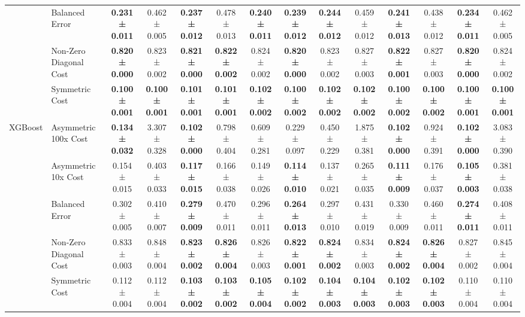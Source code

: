 \begin{table}[H]
{\begin{tabular}{llcccccccccccc}
 & Balanced Error & \textbf{0.231 ± 0.011} & 0.462 ± 0.005 & \textbf{0.237 ± 0.012} & 0.478 ± 0.013 & \textbf{0.240 ± 0.011} & \textbf{0.239 ± 0.012} & \textbf{0.244 ± 0.012} & 0.459 ± 0.012 & \textbf{0.241 ± 0.013} & 0.438 ± 0.012 & \textbf{0.234 ± 0.011} & 0.462 ± 0.005 \\
 & Non-Zero Diagonal Cost & \textbf{0.820 ± 0.000} & 0.823 ± 0.002 & \textbf{0.821 ± 0.000} & \textbf{0.822 ± 0.002} & 0.824 ± 0.002 & \textbf{0.820 ± 0.000} & 0.823 ± 0.002 & 0.827 ± 0.003 & \textbf{0.822 ± 0.001} & 0.827 ± 0.003 & \textbf{0.820 ± 0.000} & 0.824 ± 0.002 \\
 & Symmetric Cost & \textbf{0.100 ± 0.001} & \textbf{0.100 ± 0.001} & \textbf{0.101 ± 0.001} & \textbf{0.101 ± 0.001} & \textbf{0.102 ± 0.002} & \textbf{0.100 ± 0.002} & \textbf{0.102 ± 0.002} & \textbf{0.102 ± 0.002} & \textbf{0.100 ± 0.002} & \textbf{0.100 ± 0.002} & \textbf{0.100 ± 0.001} & \textbf{0.100 ± 0.001} \\
\cline{1-14}
\multirow[t]{5}{*}{XGBoost} & Asymmetric 100x Cost & \textbf{0.134 ± 0.032} & 3.307 ± 0.328 & \textbf{0.102 ± 0.000} & 0.798 ± 0.404 & 0.609 ± 0.281 & 0.229 ± 0.097 & 0.450 ± 0.229 & 1.875 ± 0.381 & \textbf{0.102 ± 0.000} & 0.924 ± 0.391 & \textbf{0.102 ± 0.000} & 3.083 ± 0.390 \\
 & Asymmetric 10x Cost & 0.154 ± 0.015 & 0.403 ± 0.033 & \textbf{0.117 ± 0.015} & 0.166 ± 0.038 & 0.149 ± 0.026 & \textbf{0.114 ± 0.010} & 0.137 ± 0.021 & 0.265 ± 0.035 & \textbf{0.111 ± 0.009} & 0.176 ± 0.037 & \textbf{0.105 ± 0.003} & 0.381 ± 0.038 \\
 & Balanced Error & 0.302 ± 0.005 & 0.410 ± 0.007 & \textbf{0.279 ± 0.009} & 0.470 ± 0.011 & 0.296 ± 0.011 & \textbf{0.264 ± 0.013} & 0.297 ± 0.010 & 0.431 ± 0.019 & 0.330 ± 0.009 & 0.460 ± 0.011 & \textbf{0.274 ± 0.011} & 0.408 ± 0.011 \\
 & Non-Zero Diagonal Cost & 0.833 ± 0.003 & 0.848 ± 0.004 & \textbf{0.823 ± 0.002} & \textbf{0.826 ± 0.004} & 0.826 ± 0.003 & \textbf{0.822 ± 0.001} & \textbf{0.824 ± 0.002} & 0.834 ± 0.003 & \textbf{0.824 ± 0.002} & \textbf{0.826 ± 0.004} & 0.827 ± 0.002 & 0.845 ± 0.004 \\
 & Symmetric Cost & 0.112 ± 0.004 & 0.112 ± 0.004 & \textbf{0.103 ± 0.002} & \textbf{0.103 ± 0.002} & \textbf{0.105 ± 0.004} & \textbf{0.102 ± 0.002} & \textbf{0.104 ± 0.003} & \textbf{0.104 ± 0.003} & \textbf{0.102 ± 0.003} & \textbf{0.102 ± 0.003} & 0.110 ± 0.004 & 0.110 ± 0.004 \\
\cline{1-14}
\bottomrule
\end{tabular}
    }
\end{table}
